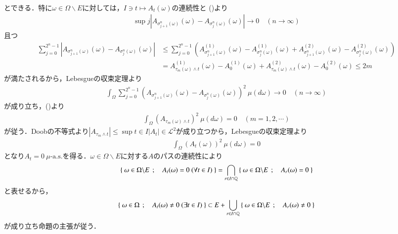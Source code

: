 \begin{prf}
\begin{align}
		\end{align}
		とできる．特に$\omega \in \Omega \backslash E$に対しては，$I \ni t \longmapsto A_t(\omega)$の連続性と
		()より
		\begin{align}
			\sup{j}{\left| A_{\sigma_{j+1}^n(\omega)}(\omega) - A_{\sigma_j^n(\omega)}(\omega) \right|} \longrightarrow 0 \quad (n \longrightarrow \infty)
		\end{align}
		且つ
		\begin{align}
			\sum_{j=0}^{2^n-1} \left| A_{\sigma_{j+1}^n(\omega)}(\omega) - A_{\sigma_j^n(\omega)}(\omega) \right|
			&\leq \sum_{j=0}^{2^n-1} \left( A^{(1)}_{\sigma_{j+1}^n(\omega)}(\omega) - A^{(1)}_{\sigma_j^n(\omega)}(\omega) + A^{(2)}_{\sigma_{j+1}^n(\omega)}(\omega) - A^{(2)}_{\sigma_j^n(\omega)}(\omega) \right) \\
			&= A^{(1)}_{\tau_m(\omega) \wedge t}(\omega) - A_0^{(1)}(\omega) + A^{(2)}_{\tau_m(\omega) \wedge t}(\omega) - A_0^{(2)}(\omega) \leq 2m
		\end{align}
		が満たされるから，Lebesgueの収束定理より
		\begin{align}
			\int_\Omega \sum_{j=0}^{2^n-1} \left( A_{\sigma_{j+1}^n(\omega)}(\omega) - A_{\sigma_j^n(\omega)}(\omega) \right)^2\ \mu(d\omega) \longrightarrow 0 \quad (n \longrightarrow \infty)
		\end{align}
		が成り立ち，()より
		\begin{align}
			\int_\Omega \left( A_{\tau_m(\omega) \wedge t} \right)^2\ \mu(d\omega) = 0 \quad (m=1,2,\cdots)
		\end{align}
		が従う．Doobの不等式より$|A_{\tau_m \wedge t}| \leq \sup{t \in I}{|A_t|} \in \mathscr{L}^2$が成り立つから，Lebesgueの収束定理より
		\begin{align}
			\int_\Omega \left( A_t(\omega) \right)^2\ \mu(d\omega)= 0
		\end{align}
		となり$A_t = 0\ \mbox{$\mu$-a.s.}$を得る．$\omega \in \Omega \backslash E$に対する$A$のパスの連続性により
		\begin{align}
			\Set{\omega \in \Omega \backslash E}{A_t(\omega) = 0\ (\forall t \in I)}
			= \bigcap_{r \in I \cap \Q} \Set{\omega \in \Omega \backslash E}{A_r(\omega) = 0}
		\end{align}
		と表せるから，
		\begin{align}
			\left\{\ \omega \in \Omega\ \, ; \quad A_t(\omega) \neq 0\ (\exists t \in I)\ \right\}
			\subset E + \bigcup_{r \in I \cap \mathbb{Q}} \left\{\ \omega \in \Omega \backslash E\ \, ; \quad A_r(\omega) \neq 0\ \right\}
		\end{align}
		が成り立ち命題の主張が従う．
		\QED
	\end{prf}
	
